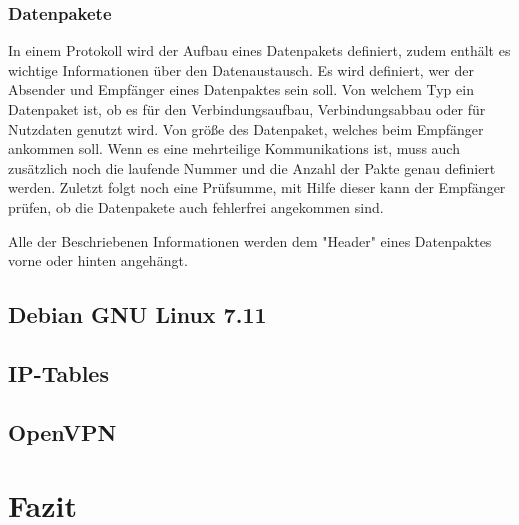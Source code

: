 \documentclass[
a4paper,     %
 headsepline, %
footsepline, %
titlepage,   %
 halfparskip,     %
 fleqn,       %
12pt         %
]{scrartcl}  %
\begin{document}
\subsubsection{Datenpakete}
In einem Protokoll wird der Aufbau eines Datenpakets definiert, zudem enthält es wichtige Informationen über den Datenaustausch. Es wird definiert, wer der Absender und Empfänger eines Datenpaktes sein soll. 
Von welchem Typ ein Datenpaket ist, ob es für den Verbindungsaufbau, Verbindungsabbau oder für Nutzdaten genutzt wird. Von größe des Datenpaket, welches beim Empfänger ankommen soll. 
Wenn es eine mehrteilige Kommunikations ist, muss auch zusätzlich noch die laufende Nummer und die Anzahl der Pakte genau definiert werden. Zuletzt folgt noch eine Prüfsumme, mit Hilfe dieser kann der Empfänger prüfen, ob die Datenpakete auch fehlerfrei angekommen sind. 

Alle der Beschriebenen Informationen werden dem "Header" eines Datenpaktes vorne oder hinten angehängt.


 

\subsection{Debian GNU Linux 7.11}
\subsection{IP-Tables}\label{iptables}
\subsection{OpenVPN}\label{openvpn}


\section{Fazit}



 \appendix  %

 

 
\end{document}
